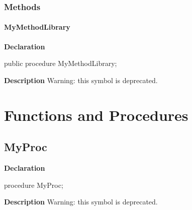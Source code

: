 \documentclass{report}
\begin{document}
\subsubsection*{\large{\textbf{Methods}}\normalsize\hspace{1ex}\hfill}
\paragraph*{MyMethodLibrary}\hspace*{\fill}

\begin{list}{}{
\setlength{\itemindent}{0cm}
\setlength{\listparindent}{0cm}
\setlength{\leftmargin}{\evensidemargin}
\addtolength{\leftmargin}{\tmplength}
\settowidth{\labelsep}{X}
\addtolength{\leftmargin}{\labelsep}
\setlength{\labelwidth}{\tmplength}
}
\begin{flushleft}
\item[\textbf{Declaration}\hfill]
\begin{ttfamily}
public procedure MyMethodLibrary;\end{ttfamily}


\end{flushleft}
\par
\item[\textbf{Description}]
Warning: this symbol is deprecated.

 

\end{list}
\section{Functions and Procedures}
\subsection*{MyProc}
\begin{list}{}{
\setlength{\itemindent}{0cm}
\setlength{\listparindent}{0cm}
\setlength{\leftmargin}{\evensidemargin}
\addtolength{\leftmargin}{\tmplength}
\settowidth{\labelsep}{X}
\addtolength{\leftmargin}{\labelsep}
\setlength{\labelwidth}{\tmplength}
}
\begin{flushleft}
\item[\textbf{Declaration}\hfill]
\begin{ttfamily}
procedure MyProc;\end{ttfamily}


\end{flushleft}
\par
\item[\textbf{Description}]
Warning: this symbol is deprecated.

 

\end{list}
\end{document}
